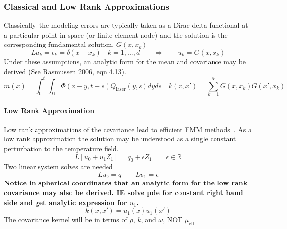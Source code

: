 \documentclass{article}         %
\theoremstyle{definition}
\theoremstyle{remark}
\begin{document}
\subsubsection{Classical and Low Rank Approximations}
Classically, the modeling errors are typically 
taken as a Dirac delta functional at a particular point in space (or
finite element node) and the solution is the corresponding fundamental
solution, $G(x,x_k)$
\[
L u_k = \epsilon_k  = \delta(x - x_k)
\quad k = 1, ..., d
\qquad
\Rightarrow
\qquad
u_k = G(x,x_k)
\]
Under these assumptions,
an analytic form for the mean and covariance may be derived
(See Rasmussen 2006, eqn 4.13).
\begin{equation} \label{PhysicsBasedCovarianceFunction}
m(x) = \int_0^t \int_D \Phi(x-y,t-s) Q_\text{laser}(y,s) dy ds
\quad
k(x,x') = \sum_{k=1}^M  G(x,x_k) G(x',x_k)
\end{equation}
\paragraph{Low Rank Approximation} 
Low rank approximations of the covariance lead to efficient FMM methods~\cite{fong2009black}.
As a low rank approximation
the solution may be understood as a single constant perturbation to the temperature
field.
\[
L \left[u_0 + u_1 Z_1\right]
= 
q_0 +  \epsilon Z_1
\qquad 
\epsilon \in \mathbb{R}
\]
Two linear system solves are needed
\[
L u_0 = q 
\qquad
L u_1 = \epsilon 
\]
\textbf{Notice in spherical coordinates that an analytic form for the low
rank covariance may also be derived. IE solve pde for constant right hand
side and get analytic expression for $u_1$.}
\[
k(x,x') = u_1(x) u_1(x')
\]
The covariance kernel will be in terms of $\rho$, $k$, and $\omega$, NOT
$\mu_\text{eff}$
\end{document}
